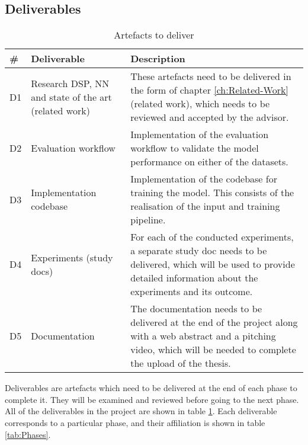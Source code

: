 \subsection{Deliverables}
\label{sec:Deliverables-Project}
\begin{table}[htb]
    \centering
    \caption{Artefacts to deliver}
	\label{tab:Deliverables}
    \begin{tabular}{p{} | p{} | p{}}
        \toprule
        \textbf{\#} & \textbf{Deliverable} & \textbf{Description} \\ 
        \midrule[1pt]
        D1 & Research \gls{DSP}, \gls{NN} and state of the art (related work) & These artefacts need to be delivered in the form of chapter \ref{ch:Related-Work} (related work), which needs to be reviewed and accepted by the advisor. \\
        \hline
        D2 & Evaluation workflow &  Implementation of the evaluation workflow to validate the model performance on either of the datasets. \\
        \hline
        D3 & Implementation codebase & Implementation of the codebase for training the model. This consists of the realisation of the input and training pipeline. \\
        \hline
        D4 & Experiments (study docs) &  For each of the conducted experiments, a separate study doc needs to be delivered, which will be used to provide detailed information about the experiments and its outcome. \\
        \hline
        D5 & Documentation & The documentation needs to be delivered at the end of the project along with a web abstract and a pitching video, which will be needed to complete the upload of the thesis. \\
        \bottomrule
    \end{tabular}
\end{table}
\noindent
Deliverables are artefacts which need to be delivered at the end of each phase to complete it. They will be examined and reviewed before going to the next phase. All of the deliverables in the project are shown in table \ref{tab:Deliverables}. Each deliverable corresponds to a particular phase, and their affiliation is shown in table \ref{tab:Phases}.


